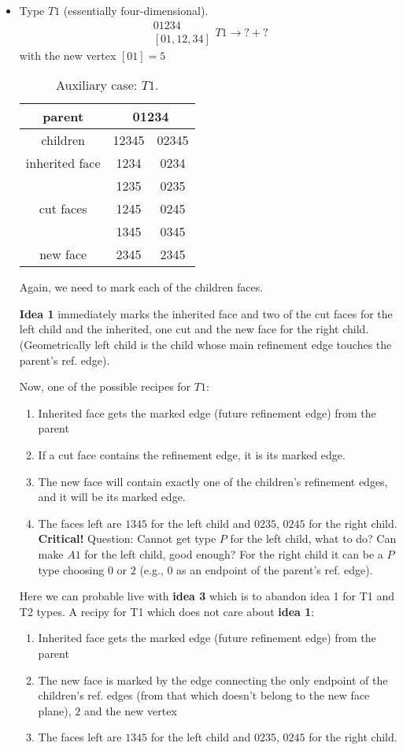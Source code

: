 \documentclass[a4paper,12pt]{amsart}
\numberwithin{equation}{section}
\begin{document}
\begin{itemize}
	
	\item Type $T1$ (essentially four-dimensional).
	$$ \begin{array}{c} 01234 \\ \left[01,12,34\right] \end{array} T1
	\rightarrow ? + ? $$
	with the new vertex $\left[01\right] = 5$
	\begin{table}[h!]
	\caption{Auxiliary case: $T1$.}
	\label{tab:Case4}
	\begin{tabular}{|c|c|c|} \hline
	parent & \multicolumn{2}{|c|}{01234} \\ \hline
	children & 12345 & 02345 \\ \hline
	inherited face & 1234 & 0234 \\ \hline
	\multirow{3}{*}{cut faces} & 1235 & 0235 \\ 
	 & 1245 & 0245 \\ 
	 & 1345 & 0345 \\ \hline
	 new face & 2345 & 2345 \\ \hline
	\end{tabular}
	\end{table}    
    Again, we need to mark each of the children faces. 
    
    \textbf{Idea 1} immediately marks the inherited face and two of the cut faces for the left child and the inherited, one cut and the new face for the right child. (Geometrically left child is the child whose main refinement edge touches the parent's ref. edge).
    
    Now, one of the possible recipes for $T1$:
    	\begin{enumerate}
		\item Inherited face gets the marked edge (future refinement edge) from the parent
		\item If a cut face contains the refinement edge, it is its marked edge.
		\item The new face will contain exactly one of the children's refinement edges, and it will be its marked edge.
		\item The faces left are $1345$ for the left child and $0235$, $0245$ for the right child. 
		\textbf{Critical!} Question: Cannot get type $P$ for the left child, what to do? Can make $A1$ for the left child, good enough? For the right child it can be a $P$ type choosing $0$ or $2$ (e.g., $0$ as an endpoint of the parent's ref. edge).
	\end{enumerate}
		
		Here we can probable live with \textbf{idea 3} which is to abandon idea 1 for T1 and T2 types.
		A recipy for T1 which does not care about \textbf{idea 1}:
    	\begin{enumerate}
		\item Inherited face gets the marked edge (future refinement edge) from the parent
		\item The new face is marked by the edge connecting the only endpoint of the children's ref. edges (from that which doesn't belong to the new face plane), $2$ and the new vertex
		\item The faces left are $1345$ for the left child and $0235$, $0245$ for the right child. 
	\end{enumerate}
	

\end{itemize}
\end{document}
